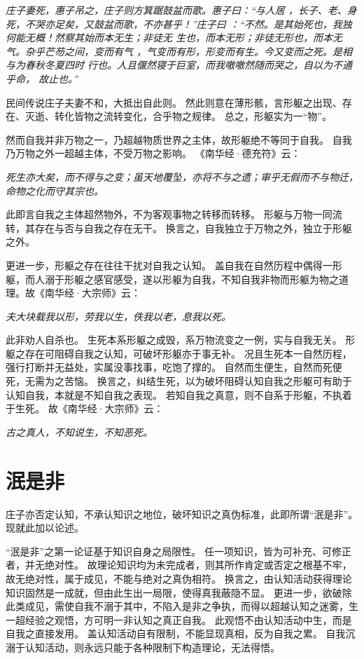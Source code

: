 \documentclass[11pt]{article}
\begin{document}
\textit{庄子妻死，惠子吊之，庄子则方箕踞鼓盆而歌。惠子曰：“与人居 ，长子、老、身死，不哭亦足矣，又鼓盆而歌，不亦甚乎！”庄子曰 ：“不然。是其始死也，我独何能无概！然察其始而本无生；非徒无 生也，而本无形；非徒无形也，而本无气。杂乎芒芴之间，变而有气 ，气变而有形，形变而有生。今又变而之死。是相与为春秋冬夏四时 行也。人且偃然寝于巨室，而我噭噭然随而哭之，自以为不通乎命， 故止也。”}

民间传说庄子夫妻不和，大抵出自此则。
然此则意在薄形骸，言形躯之出现、存在、灭逝、转化皆物之流转变化，合乎物之规律。
总之，形躯实为一“物”。

\newline

然而自我并非万物之一，乃超越物质世界之主体，故形躯绝不等同于自我。
自我乃万物之外一超越主体，不受万物之影响。
《南华经·德充符》云：


\textit{死生亦大矣，而不得与之变；虽天地覆坠，亦将不与之遗；审乎无假而不与物迁，命物之化而守其宗也。}

此即言自我之主体超然物外，不为客观事物之转移而转移。
形躯与万物一同流转，其存在与否与自我之存在无干。
换言之，自我独立于万物之外，独立于形躯之外。

\newline

更进一步，形躯之存在往往干扰对自我之认知。
盖自我在自然历程中偶得一形躯，而人溺于形躯之感官感受，遂以形躯为自我，不知自我非物而形躯为物之道理。故《南华经·大宗师》云：

\textit{夫大块载我以形，劳我以生，佚我以老，息我以死。}

此非劝人自杀也。
生死本系形躯之成毁，系万物流变之一例，实与自我无关。
形躯之存在可阻碍自我之认知，可破坏形躯亦于事无补。
况且生死本一自然历程，强行打断并无益处，实属没事找事，吃饱了撑的。
自然而生便生，自然而死便死，无需为之苦恼。
换言之，纠结生死，以为破坏阻碍认知自我之形躯可有助于认知自我，本就是不知自我之表现。
若知自我之真意，则不自系于形躯，不执着于生死。
故《南华经·大宗师》云：

\textit{古之真人，不知说生，不知恶死。}

\section{泯是非}
庄子亦否定认知，不承认知识之地位，破坏知识之真伪标准，此即所谓“泯是非”。
现就此加以论述。

\newline

“泯是非”之第一论证基于知识自身之局限性。
任一项知识，皆为可补充、可修正者，并无绝对性。
故理论知识均为未完成者，则其所作肯定或否定之根基不牢，故无绝对性，属于成见，不能与绝对之真伪相符。
换言之，由认知活动获得理论知识固然是一成就，但由此生出一局限，使得真我蔽隐不显。
更进一步，欲破除此类成见，需使自我不溺于其中，不陷入是非之争执，而得以超越认知之迷雾，生一超经验之观悟，方可明一非认知之真正自我。
此观悟不由认知活动中生，而是自我之直接发用。
盖认知活动自有限制，不能显现真相，反为自我之累。
自我沉溺于认知活动，则永远只能于各种限制下构造理论，无法得悟。
\end{document}
